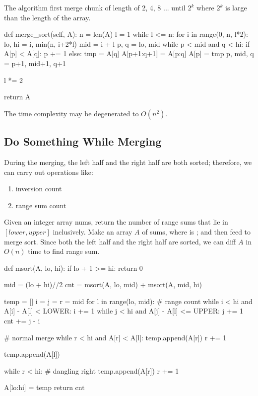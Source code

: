 The algorithm first merge chunk of length of 2, 4, 8 ... until $2^k$ where $2^k$ is large than the length of the array.
\begin{python}
def merge_sort(self, A):
  n = len(A)
  l = 1
  while l <= n:
    for i in range(0, n, l*2):
      lo, hi = i, min(n, i+2*l)
      mid = i + l
      p, q = lo, mid
      while p < mid and q < hi:
        if A[p] < A[q]:
          p += 1
        else:
          tmp = A[q]
          A[p+1:q+1] = A[p:q]
          A[p] = tmp
          p, mid, q = p+1, mid+1, q+1

    l *= 2

  return A
\end{python}
The time complexity may be degenerated to $O(n^2)$. 
\subsection{Do Something While Merging}
During the merging, the left half and the right half are both sorted; therefore, we can carry out operations like:
\begin{enumerate}
\item inversion count 
\item range sum count 
\end{enumerate}

 Given an integer array nums, return the number of range sums that lie in $[lower, upper]$ inclusively. Make an array $A$ of sums, where  is ; and then feed to merge sort. Since both the left half and the right half are sorted, we can diff $A$ in $O(n)$ time to find range sum. 

\begin{python}
def msort(A, lo, hi):
  if lo + 1 >= hi:
    return 0

  mid = (lo + hi)//2
  cnt = msort(A, lo, mid) + msort(A, mid, hi)

  temp = []
  i = j = r = mid
  for l in range(lo, mid):
    # range count
    while i < hi and A[i] - A[l] <  LOWER: i += 1
    while j < hi and A[j] - A[l] <= UPPER: j += 1
    cnt += j - i

    # normal merge 
    while r < hi and A[r] < A[l]:
      temp.append(A[r])
      r += 1

    temp.append(A[l])

  while r < hi:  # dangling right
    temp.append(A[r])
    r += 1

  A[lo:hi] = temp
  return cnt
\end{python}

